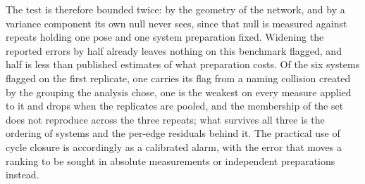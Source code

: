 The test is therefore bounded twice: by the geometry of the network, and by a variance component
its own null never sees, since that null is measured against repeats holding one pose and one
system preparation fixed. Widening the reported errors by half already leaves nothing on this
benchmark flagged, and half is less than published estimates of what preparation costs. Of the six
systems flagged on the first replicate, one carries its flag from a naming collision created by the
grouping the analysis chose, one is the weakest on every measure applied to it and drops when the
replicates are pooled, and the membership of the set does not reproduce across the three repeats;
what survives all three is the ordering of systems and the per-edge residuals behind it. The
practical use of cycle closure is accordingly as a calibrated alarm, with the error that moves a
ranking to be sought in absolute measurements or independent preparations instead.

\clearpage

